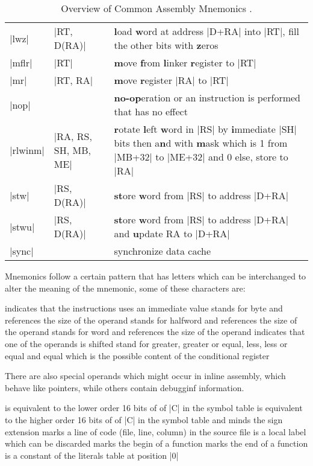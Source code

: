 \begin{table}[htbp]
\begin{tabular}{l l p{9cm}}
    |lwz| & |RT, D(RA)| & \textbf{l}oad \textbf{w}ord at address |D+RA| into |RT|, fill the other bits with \textbf{z}eros \\
    |mflr| & |RT| & \textbf{m}ove \textbf{f}rom \textbf{l}inker \textbf{r}egister to |RT|\\
    |mr| & |RT, RA| & \textbf{m}ove \textbf{r}egister |RA| to |RT| \\
    |nop| & & \textbf{no-op}eration or an instruction is performed that has no effect\\
    |rlwinm| & |RA, RS, SH, MB, ME| & \textbf{r}otate \textbf{l}eft \textbf{w}ord in |RS| by \textbf{i}mmediate |SH| bits then a\textbf{n}d with \textbf{m}ask which is 1 from |MB+32| to |ME+32| and 0 else, store to |RA|\\
    |stw| & |RS, D(RA)| & \textbf{st}ore \textbf{w}ord from |RS| to address |D+RA|\\
    |stwu| & |RS, D(RA)| & \textbf{st}ore \textbf{w}ord from |RS| to address |D+RA| and \textbf{u}pdate RA to |D+RA|\\
    |sync| & & synchronize data cache\\
\end{tabular}
\caption {\label{tab:asm} Overview of Common Assembly Mnemonics \cite{PPCman1, PPCman2}.}
\end{table}

Mnemonics follow a certain pattern that has letters which can be interchanged to alter the meaning of the mnemonic, some of these characters are:
\begin{description}
     indicates that the instructions uses an immediate value
     stands for byte and references the size of the operand
     stands for halfword and references the size of the operand
     stands for word and references the size of the operand
     indicates that one of the operands is shifted
     stand for greater, greater or equal, less, less or equal and equal which is the possible content of the conditional register
\end{description}

There are also special operands which might occur in inline assembly, which behave like pointers, while others contain debugginf information.
\begin{description}
     is equivalent to the lower order 16 bits of of |C| in the symbol table
     is equivalent to the higher order 16 bits of of |C| in the symbol table and minds the sign extension
     marks a line of code (file, line, column) in the source file
     is a local label which can be discarded
     marks the begin of a function
     marks the end of a function
     is a constant of the literals table at position |0|
\end{description}

